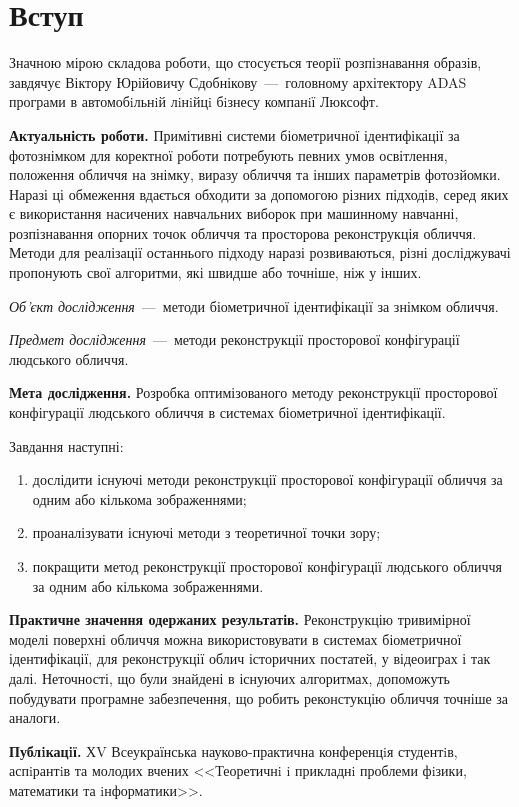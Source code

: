 \chapter*{Вступ}

Значною мірою складова роботи, що стосується теорії розпізнавання образів,
завдячує Віктору Юрійовичу Сдобнікову~---~головному архітектору ADAS
програми в автомобiльнiй лiнiйцi бiзнесу компанiї Люксофт.

\textbf{Актуальність роботи.}
Примітивні системи біометричної ідентифікації за фотознімком
для коректної роботи потребують певних умов
освітлення, положення обличчя на знімку, виразу обличчя
та інших параметрів фотозйомки.
Наразі ці обмеження вдається обходити за допомогою різних підходів,
серед яких є
використання насичених навчальних виборок при машинному навчанні,
розпізнавання опорних точок обличчя
та просторова реконструкція обличчя.
Методи для реалізації останнього підходу наразі розвиваються,
різні досліджувачі пропонують свої алгоритми,
які швидше або точніше, ніж у інших.

\textit{Об’єкт дослідження}~---~методи біометричної ідентифікації за
знімком обличчя.

\textit{Предмет дослідження}~---~методи реконструкції просторової конфігурації
людського обличчя.

\textbf{Мета дослідження.}
Розробка оптимізованого методу реконструкції просторової конфігурації
людського обличчя в системах біометричної ідентифікації.

Завдання наступні:
\begin{enumerate}
  \item
    дослідити існуючі методи реконструкції просторової конфігурації обличчя
    за одним або кількома зображеннями;
  \item
    проаналізувати існуючі методи з теоретичної точки зору;
  \item
    покращити метод реконструкції просторової конфігурації людського обличчя
    за одним або кількома зображеннями.
\end{enumerate}

\textbf{Практичне значення одержаних результатів.}
Реконструкцію тривимірної моделі поверхні обличчя
можна використовувати в системах біометричної ідентифікації,
для реконструкції облич історичних постатей,
у відеоиграх і так далі.
Неточності, що були знайдені в існуючих алгоритмах,
допоможуть побудувати програмне забезпечення,
що робить реконстукцію обличчя точніше за аналоги.

\textbf{Публiкацiї.}
ХV Всеукраїнська науково-практична конференцiя студентiв,
аспiрантiв та молодих вчених
<<Теоретичнi i прикладнi проблеми фiзики, математики та iнформатики>>.
